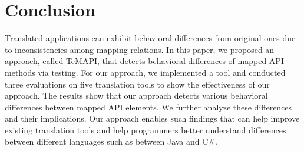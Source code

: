 \section{Conclusion}
\label{sec:conclusion}

Translated applications can exhibit behavioral differences from original ones due to inconsistencies among mapping relations. In this paper, we proposed an approach, called TeMAPI, that detects behavioral differences of mapped API methods via testing. For our approach, we implemented a tool and conducted three evaluations on five translation tools to show the effectiveness of our approach. The results show that our approach detects various behavioral differences between mapped API elements. We further analyze these differences and their implications. Our approach enables such findings that can help improve existing translation tools and help programmers better understand differences between different languages such as between Java and C\#.

